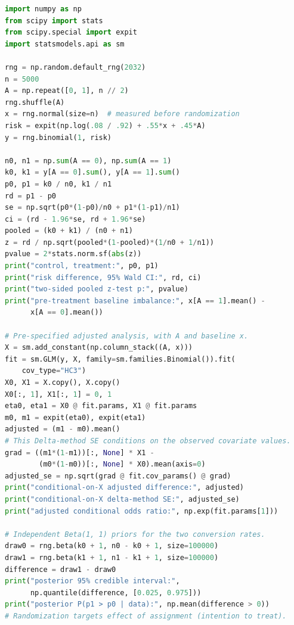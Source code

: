 \documentclass[11pt,a4paper,oneside]{report}
\numberwithin{equation}{chapter}
\theoremstyle{plain}
\theoremstyle{definition}
\theoremstyle{remark}
\begin{document}
\begin{lstlisting}[language=Python,caption={Kompletny program: A/B testing z analizą podstawową, standaryzacją logistyczną i posteriorowym porównaniem odsetków (Python, NumPy, SciPy, statsmodels).}]
import numpy as np
from scipy import stats
from scipy.special import expit
import statsmodels.api as sm

rng = np.random.default_rng(2032)
n = 5000
A = np.repeat([0, 1], n // 2)
rng.shuffle(A)
x = rng.normal(size=n)  # measured before randomization
risk = expit(np.log(.08 / .92) + .55*x + .45*A)
y = rng.binomial(1, risk)

n0, n1 = np.sum(A == 0), np.sum(A == 1)
k0, k1 = y[A == 0].sum(), y[A == 1].sum()
p0, p1 = k0 / n0, k1 / n1
rd = p1 - p0
se = np.sqrt(p0*(1-p0)/n0 + p1*(1-p1)/n1)
ci = (rd - 1.96*se, rd + 1.96*se)
pooled = (k0 + k1) / (n0 + n1)
z = rd / np.sqrt(pooled*(1-pooled)*(1/n0 + 1/n1))
pvalue = 2*stats.norm.sf(abs(z))
print("control, treatment:", p0, p1)
print("risk difference, 95% Wald CI:", rd, ci)
print("two-sided pooled z-test p:", pvalue)
print("pre-treatment baseline imbalance:", x[A == 1].mean() -
      x[A == 0].mean())

# Pre-specified adjusted analysis, with A and baseline x.
X = sm.add_constant(np.column_stack((A, x)))
fit = sm.GLM(y, X, family=sm.families.Binomial()).fit(
    cov_type="HC3")
X0, X1 = X.copy(), X.copy()
X0[:, 1], X1[:, 1] = 0, 1
eta0, eta1 = X0 @ fit.params, X1 @ fit.params
m0, m1 = expit(eta0), expit(eta1)
adjusted = (m1 - m0).mean()
# This Delta-method SE conditions on the observed covariate values.
grad = ((m1*(1-m1))[:, None] * X1 -
        (m0*(1-m0))[:, None] * X0).mean(axis=0)
adjusted_se = np.sqrt(grad @ fit.cov_params() @ grad)
print("conditional-on-X adjusted difference:", adjusted)
print("conditional-on-X delta-method SE:", adjusted_se)
print("adjusted conditional odds ratio:", np.exp(fit.params[1]))

# Independent Beta(1, 1) priors for the two conversion rates.
draw0 = rng.beta(k0 + 1, n0 - k0 + 1, size=100000)
draw1 = rng.beta(k1 + 1, n1 - k1 + 1, size=100000)
difference = draw1 - draw0
print("posterior 95% credible interval:",
      np.quantile(difference, [0.025, 0.975]))
print("posterior P(p1 > p0 | data):", np.mean(difference > 0))
# Randomization targets effect of assignment (intention to treat).
\end{lstlisting}
\end{document}
